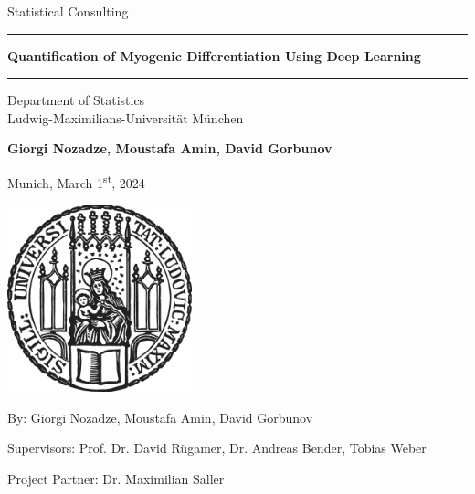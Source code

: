 \documentclass[12pt]{article}
\newcommand{\mytitle}{Quantification of Myogenic Differentiation Using Deep Learning}
\newcommand{\myname}{Giorgi Nozadze, Moustafa Amin, David Gorbunov}
\newcommand{\mysupervisor}{Prof. Dr. David Rügamer, Dr. Andreas Bender, Tobias Weber}
\newcommand{\mypartner}{Dr. Maximilian Saller}
\numberwithin{equation}{section}
\numberwithin{figure}{section}
\begin{document}
	
	
	\begin{titlepage}
		\begin{center}
			
			\LARGE
			Statistical Consulting
			
			\vspace{0.5cm}
			
			\rule{\textwidth}{1.5pt}
			\LARGE
			\textbf{\mytitle}
			\rule{\textwidth}{1.5pt}
			
			\vspace{0.5cm}
			
			\large
			Department of Statistics \\
			Ludwig-Maximilians-Universität München 
			
			\vfill
			
			\Large
			\textbf{\myname}
			
			\vfill
			
			\large
			Munich, March 1\textsuperscript{st}, 2024
			
			\vfill
			
			\includegraphics[width = 0.4\textwidth]{sigillum.png}
			
			\vfill
			
			\normalsize
			By: \myname			
		
			Supervisors: \mysupervisor
						
			Project Partner: \mypartner

			\vfill

			
			
		\end{center}
	\end{titlepage}
 	
 	\listoffigures
 	\listoftables
 	\clearpage
	\tableofcontents
	\newpage
	\setcounter{page}{1}
	\newpage
	
	\newpage
	
	\newpage
	
	\newpage
	
	\newpage
	
	\newpage
	
	\newpage
	
	\newpage
	\printbibliography
	\appendix
	\cleardoublepage
	
\end{document}
